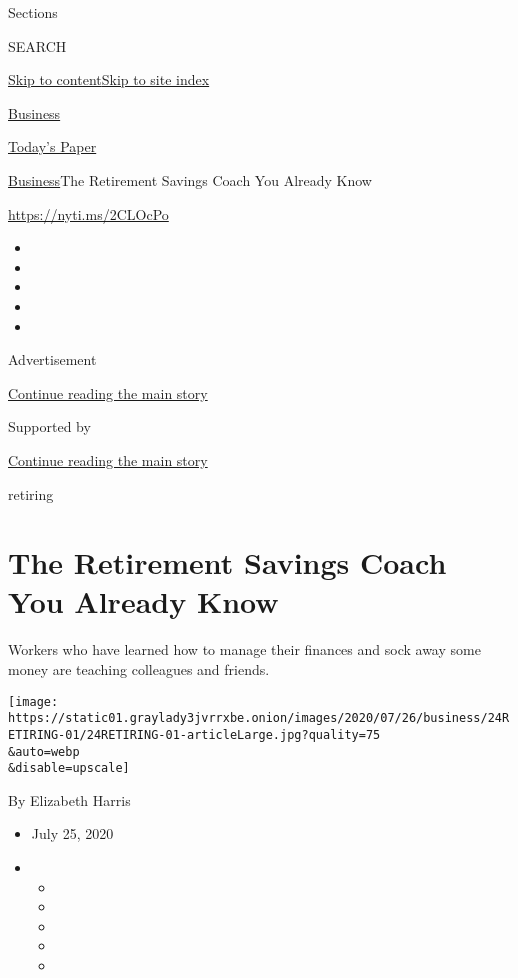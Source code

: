 Sections

SEARCH

\protect\hyperlink{site-content}{Skip to
content}\protect\hyperlink{site-index}{Skip to site index}

\href{https://www.nytimes3xbfgragh.onion/section/business}{Business}

\href{https://myaccount.nytimes3xbfgragh.onion/auth/login?response_type=cookie\&client_id=vi}{}

\href{https://www.nytimes3xbfgragh.onion/section/todayspaper}{Today's
Paper}

\href{/section/business}{Business}\textbar{}The Retirement Savings Coach
You Already Know

\url{https://nyti.ms/2CLOcPo}

\begin{itemize}
\item
\item
\item
\item
\item
\end{itemize}

Advertisement

\protect\hyperlink{after-top}{Continue reading the main story}

Supported by

\protect\hyperlink{after-sponsor}{Continue reading the main story}

retiring

\hypertarget{the-retirement-savings-coach-you-already-know}{%
\section{The Retirement Savings Coach You Already
Know}\label{the-retirement-savings-coach-you-already-know}}

Workers who have learned how to manage their finances and sock away some
money are teaching colleagues and friends.

\texttt{[image: https://static01.graylady3jvrrxbe.onion/images/2020/07/26/business/24RETIRING-01/24RETIRING-01-articleLarge.jpg?quality=75\\\&auto=webp\\\&disable=upscale]}

By Elizabeth Harris

\begin{itemize}
\item
  July 25, 2020
\item
  \begin{itemize}
  \item
  \item
  \item
  \item
  \item
  \end{itemize}
\end{itemize}

